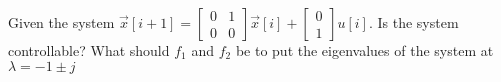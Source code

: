 \begin{enumerate}











\qitem Given the system  $\vec{x}[i+1] = \begin{bmatrix} 0 & 1 \\ 0 & 0 \end{bmatrix} \vec{x}[i] + \begin{bmatrix} 0 \\ 1 \end{bmatrix} u[i]$. Is the system controllable? What should $f_1$ and $f_2$ be to put the eigenvalues of the system at $\lambda = -1 \pm j$


\end{enumerate}
